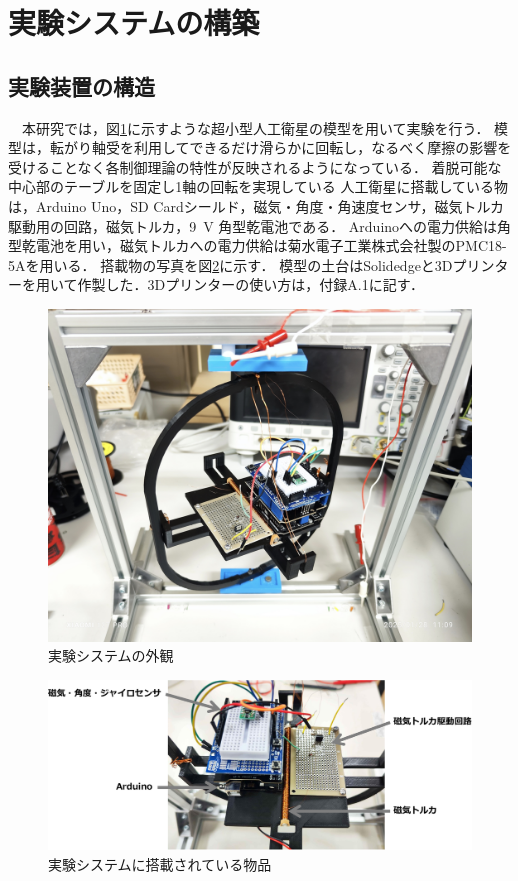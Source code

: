 \section{実験システムの構築}
\subsection{実験装置の構造}
　本研究では，図\ref{fig:souti}に示すような超小型人工衛星の模型を用いて実験を行う．
模型は，転がり軸受を利用してできるだけ滑らかに回転し，なるべく摩擦の影響を受けることなく各制御理論の特性が反映されるようになっている．
着脱可能な中心部のテーブルを固定し1軸の回転を実現している
人工衛星に搭載している物は，Arduino Uno，SD Cardシールド，磁気・角度・角速度センサ，磁気トルカ駆動用の回路，磁気トルカ，9~V 角型乾電池である．
Arduinoへの電力供給は角型乾電池を用い，磁気トルカへの電力供給は菊水電子工業株式会社製のPMC18-5Aを用いる．
搭載物の写真を図\ref{fig:system}に示す．
模型の土台はSolidedgeと3Dプリンターを用いて作製した．3Dプリンターの使い方は，付録A.1に記す．

\begin{figure}[H]
	\centering
		\includegraphics[scale=0.07]{./figure/実験装置.jpg}
		\caption{実験システムの外観}
		\label{fig:souti}
\end{figure}


\begin{figure}[H]
	\centering
		\includegraphics[scale=0.4]{./figure/実験システム.pdf}
		\caption{実験システムに搭載されている物品}
		\label{fig:system}
\end{figure}


